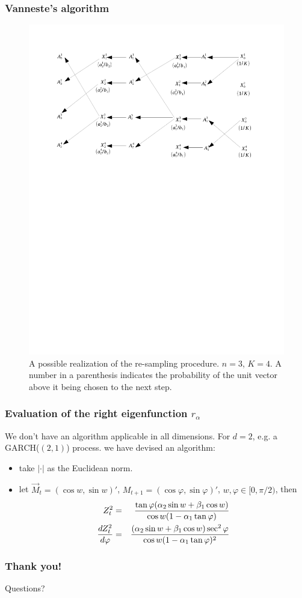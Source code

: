 \documentclass{beamer}
\begin{document}
\begin{frame}
  \frametitle{Vanneste's algorithm}
  \begin{figure}[htb!]
    \centering
    \includegraphics[width=0.8\linewidth, trim=2cm 16.5cm 2.5cm 2cm, clip]{AnandsEstimator.pdf}
    \caption{A possible realization of the re-sampling procedure. $n =
      3$, $K = 4$. A number in a parenthesis indicates the probability
      of the unit vector above it being chosen to the next step.}
    \label{fig:AnandsEstimator}
  \end{figure}
\end{frame}

\begin{frame}
  \frametitle{Evaluation of the right eigenfunction $r_\alpha$}
  We don't have an algorithm applicable in all dimensions. For $d = 2$,
  e.g. a GARCH($(2, 1)$) process. we have devised an algorithm:
  \begin{itemize}
  \item take $|\cdot|$ as the Euclidean norm.
  \item let $\vec M_t = (\cos w, \sin w)'$,
    $M_{t+1} = (\cos\varphi, \sin\varphi)'$,
    $w, \varphi \in [0, \pi/2)$, then
    \begin{eqnarray}
      Z_t^2 &=&
      {\tan\varphi (\alpha_2 \sin w + \beta_1 \cos w)
        \over
        \cos w (1- \alpha_1 \tan\varphi)
      } \label{eq:rthy} \\
      {d Z_{t}^2 \over d\varphi}
      &=&
      {
        (\alpha_2 \sin w + \beta_1 \cos w) \sec^2\varphi
        \over
        \cos w (1 - \alpha_1 \tan\varphi)^2
      } \nonumber
    \end{eqnarray}
  \end{itemize}
\end{frame}

\begin{frame}
   \frametitle{Thank you!}
   Questions?
 \end{frame}


\end{document}
